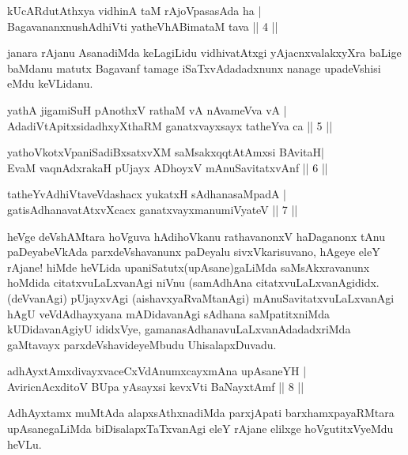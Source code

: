 \begin{shl}
kUcARdutAthxya vidhinA taM rAjoVpasasAda ha |\\
BagavananxnushAdhiVti yatheVhABimataM tava \hfill || 4 || 
\end{shl}

\begin{artha}
janara rAjanu AsanadiMda keLagiLidu vidhivatAtxgi yAjacnxvalakxyXra baLige baMdanu matutx Bagavanf tamage iSaTxvAdadadxnunx nanage upadeVshisi eMdu keVLidanu.
\end{artha}


\begin{shl}
yathA jigamiSuH pAnothxV rathaM vA nAvameVva vA |\\
AdadiVtA\s \s pitxsidadhxyXthaRM ganatxvayxsayx tatheYva ca \hfill || 5 || 
\end{shl}

\begin{shl}
yathoVkotxVpaniSadiBxsatxvXM saMsakxqqtAtAmx\s si BAvitaH|\\
EvaM vaqnAdxrakaH pUjayx ADhoyxV mAnuSavitatxvAnf \hfill || 6 || 
\end{shl}

\begin{shl}
tatheYvAdhiVtaveVdashacx yukatxH sAdhanasaMpadA |\\
gatisAdhanavatAtxvXcacx ganatxvayxmanumiVyateV \hfill || 7 || 
\end{shl}

\begin{artha}
heVge deVshAMtara hoVguva hAdihoVkanu rathavanonxV haDaganonx tAnu paDeyabeVkAda parxdeVshavanunx paDeyalu sivxVkarisuvano, hAgeye eleY rAjane! hiMde heVLida upaniSatutx(upAsane)gaLiMda saMsAkxravanunx hoMdida citatxvuLaLxvanAgi niVnu (samAdhAna citatxvuLaLxvanAgididx. (deVvanAgi) pUjayxvAgi (aishavxyaRvaMtanAgi) mAnuSavitatxvuLaLxvanAgi hAgU veVdAdhayxyana mADidavanAgi sAdhana saMpatitxniMda kUDidavanAgiyU ididxVye, gamanasAdhanavuLaLxvanAdadadxriMda gaMtavayx parxdeVshavideyeMbudu UhisalapxDuvadu.
\end{artha}

\begin{shl}
adhAyxtAmxdivayxvaceCxVdAnumxcayxmAna upAsaneYH |\\
AviricnAcxditoV BUpa yAsayxsi kevxVti BaNayxtAmf \hfill || 8 || 
\end{shl}

\begin{artha}
AdhAyxtamx muMtAda alapxsAthxnadiMda parxjApati barxhamxpayaRMtara upAsanegaLiMda biDisalapxTaTxvanAgi eleY rAjane elilxge hoVgutitxVyeMdu heVLu.
\end{artha}

